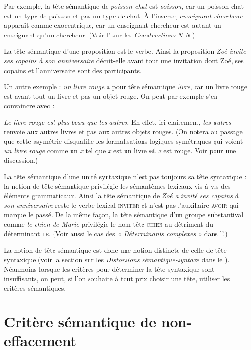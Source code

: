 Par exemple, la tête sémantique de \textit{poisson-chat} est \textit{poisson}, car un poisson-chat est un type de poisson et pas un type de chat. À l’inverse, \textit{en\-sei\-gnant-cher\-cheur} apparaît comme exocentrique, car un en\-sei\-gnant-cher\-cheur est autant un enseignant qu’un chercheur. (Voir l’ sur les \textit{Constructions N N}.)

La tête sémantique d’une proposition est le verbe. Ainsi la proposition \textit{Zoé invite ses copains à son anniversaire} décrit-elle avant tout une invitation dont Zoé, ses copains et l’anniversaire sont des participants.

Un autre exemple : \textit{un livre rouge} a pour tête sémantique \textit{livre}, car un livre rouge est avant tout un livre et pas un objet rouge. On peut par exemple s’en convaincre avec :

\ea
    \textit{{Le livre rouge est plus beau que les autres.}}
\z
En effet, ici clairement, \textit{les autres} renvoie aux autres livres et pas aux autres objets rouges. (On notera au passage que cette asymétrie disqualifie les formalisations logiques symétriques qui voient \textit{un livre rouge} comme un \textit{x} tel que \textit{x} est un livre \textbf{et} \textit{x} est rouge. Voir \citealt{higginbotham1985semantics} pour une discussion.) 

\begin{sloppypar}
La tête sémantique d’une unité syntaxique n’est pas toujours sa tête syntaxique : la notion de tête sémantique privilégie les sémantèmes lexicaux vis-à-vis des éléments grammaticaux. Ainsi la tête sémantique de \textit{Zoé a invité ses copains à son anniversaire} reste le verbe lexical \textsc{inviter} et n’est pas l’auxiliaire \textsc{avoir} qui marque le passé. De la même façon, la tête sémantique d’un groupe substantival comme \textit{le chien de Marie} privilégie le nom tête \textsc{chien} au détriment du déterminant \textsc{le}. (Voir aussi le cas des \textit{« Déterminants complexes »}
dans l'.)
\end{sloppypar}

La notion de tête sémantique est donc une notion distincte de celle de tête syntaxique (voir la section sur les \textit{Distorsions sémantique-syntaxe} dans le ). Néanmoins lorsque les critères pour déterminer la tête syntaxique sont insuffisants, on peut, si l’on souhaite à tout prix choisir une tête, utiliser les critères sémantiques.

\section{Critère sémantique de non-effacement}\label{sec:3.3.18}\largerpage


